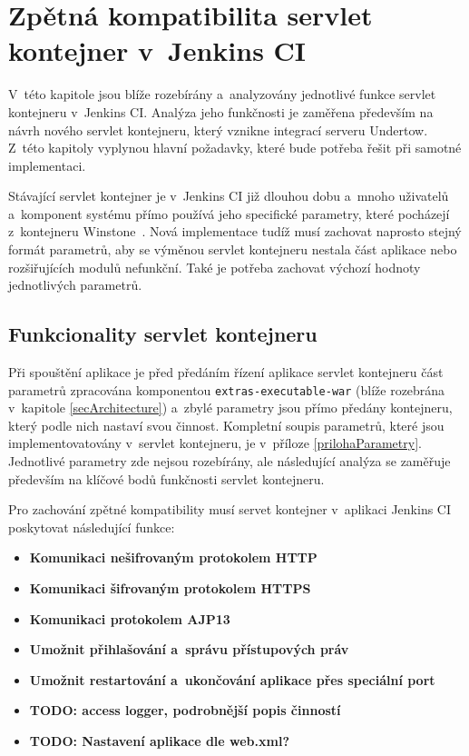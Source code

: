  


    \section{Zpětná kompatibilita servlet kontejner v~Jenkins CI}   \label{secKompatibilita}
        V~této kapitole jsou blíže rozebírány a~analyzovány jednotlivé funkce servlet
        kontejneru v~Jenkins CI. Analýza jeho funkčnosti je zaměřena především na 
        návrh nového servlet kontejneru, který vznikne integrací serveru Undertow.
        Z~této kapitoly vyplynou hlavní požadavky, které bude potřeba řešit 
        při samotné implementaci.

        Stávající servlet kontejner je v~Jenkins CI již dlouhou dobu
        a~mnoho uživatelů a~komponent systému přímo používá jeho specifické
        parametry, které pocházejí z~kontejneru Winstone~\cite{kohsukeTopic}. Nová implementace
        tudíž musí zachovat naprosto stejný formát parametrů, aby 
        se výměnou servlet kontejneru nestala část aplikace nebo rozšiřujících modulů nefunkční.
        Také je potřeba zachovat výchozí hodnoty jednotlivých parametrů.

        \subsection{Funkcionality servlet kontejneru}
            Při spouštění aplikace je před předáním řízení aplikace servlet kontejneru
            část parametrů zpracována komponentou \texttt{extras-executable-war} (blíže 
            rozebrána v~kapitole \ref{secArchitecture}) a~zbylé parametry jsou přímo
            předány kontejneru, který podle nich nastaví svou činnost. Kompletní
            soupis parametrů, které jsou implementovatovány v~servlet kontejneru,
            je v~příloze \ref{prilohaParametry}.
            Jednotlivé parametry zde nejsou rozebírány, ale následující analýza
            se zaměřuje především na klíčové bodů funkčnosti servlet kontejneru.

            Pro zachování zpětné kompatibility musí servet kontejner v~aplikaci 
            Jenkins CI poskytovat následující funkce:
            
            \newpage
            \begin{itemize}
                \item{\textbf{Komunikaci nešifrovaným protokolem HTTP}}
                \item{\textbf{Komunikaci šifrovaným protokolem HTTPS}}
                \item{\textbf{Komunikaci protokolem AJP13}} 
                \item{\textbf{Umožnit přihlašování a~správu přístupových práv} }
                \item{\textbf{Umožnit restartování a~ukončování aplikace přes speciální port}}
                \item{\textbf{TODO: access logger, podrobnější popis činností}}
                \item{\textbf{TODO: Nastavení aplikace dle web.xml?}}
            \end{itemize}
            

